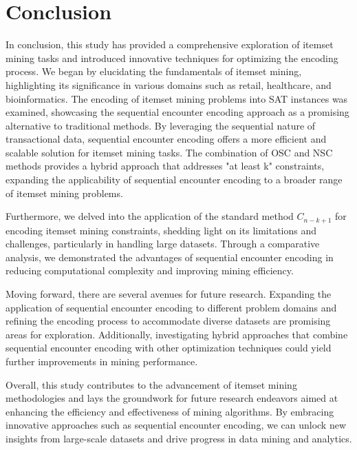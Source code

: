 \section{Conclusion}

In conclusion, this study has provided a comprehensive exploration of itemset mining tasks and introduced innovative techniques for optimizing the encoding process.
We began by elucidating the fundamentals of itemset mining, highlighting its significance in various domains such as retail,
healthcare, and bioinformatics.
The encoding of itemset mining problems into SAT instances was examined,
showcasing the sequential encounter encoding approach as a promising alternative to traditional methods.
By leveraging the sequential nature of transactional data, sequential encounter encoding offers a more efficient and scalable solution for itemset mining tasks.
The combination of OSC and NSC methods provides a hybrid approach that addresses "at least k" constraints,
expanding the applicability of sequential encounter encoding to a broader range of itemset mining problems.


Furthermore, we delved into the application of the standard method $C_{n-k+1}$
for encoding itemset mining constraints, shedding light on its limitations and challenges, particularly in handling large datasets.
Through a comparative analysis, we demonstrated the advantages of sequential encounter encoding in reducing computational complexity and improving mining efficiency.

Moving forward, there are several avenues for future research. Expanding the application of sequential encounter encoding to different problem domains and refining the encoding process to accommodate diverse datasets are promising areas for exploration. Additionally, investigating hybrid approaches that combine sequential encounter encoding with other optimization techniques could yield further improvements in mining performance.

Overall, this study contributes to the advancement of itemset mining methodologies and lays the groundwork for future research endeavors aimed at enhancing the efficiency and effectiveness of mining algorithms. By embracing innovative approaches such as sequential encounter encoding, we can unlock new insights from large-scale datasets and drive progress in data mining and analytics.